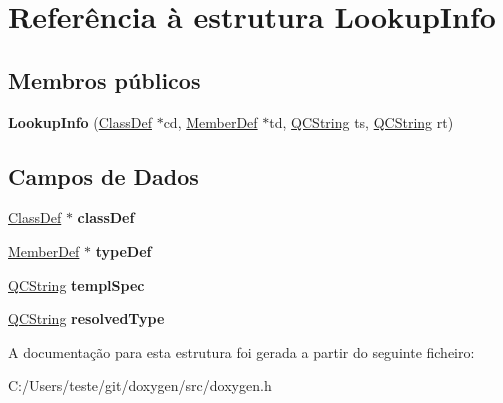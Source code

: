 \hypertarget{struct_lookup_info}{\section{Referência à estrutura Lookup\-Info}
\label{struct_lookup_info}
}
\subsection*{Membros públicos}
\begin{DoxyCompactItemize}
\item 
\hypertarget{struct_lookup_info_a99219df5d3ee05bde9ed501a3df36625}{{\bfseries Lookup\-Info} (\hyperlink{class_class_def}{Class\-Def} $\ast$cd, \hyperlink{class_member_def}{Member\-Def} $\ast$td, \hyperlink{class_q_c_string}{Q\-C\-String} ts, \hyperlink{class_q_c_string}{Q\-C\-String} rt)}\label{struct_lookup_info_a99219df5d3ee05bde9ed501a3df36625}

\end{DoxyCompactItemize}
\subsection*{Campos de Dados}
\begin{DoxyCompactItemize}
\item 
\hypertarget{struct_lookup_info_a9ecae2706174bc69faacb7156966b12e}{\hyperlink{class_class_def}{Class\-Def} $\ast$ {\bfseries class\-Def}}\label{struct_lookup_info_a9ecae2706174bc69faacb7156966b12e}

\item 
\hypertarget{struct_lookup_info_af0a145c155563dda69863421befbdac3}{\hyperlink{class_member_def}{Member\-Def} $\ast$ {\bfseries type\-Def}}\label{struct_lookup_info_af0a145c155563dda69863421befbdac3}

\item 
\hypertarget{struct_lookup_info_a9f49692ba930267b7dfbdbc9a231cae9}{\hyperlink{class_q_c_string}{Q\-C\-String} {\bfseries templ\-Spec}}\label{struct_lookup_info_a9f49692ba930267b7dfbdbc9a231cae9}

\item 
\hypertarget{struct_lookup_info_a5a854e81e0e348b24d0b42d5cb121d3d}{\hyperlink{class_q_c_string}{Q\-C\-String} {\bfseries resolved\-Type}}\label{struct_lookup_info_a5a854e81e0e348b24d0b42d5cb121d3d}

\end{DoxyCompactItemize}


A documentação para esta estrutura foi gerada a partir do seguinte ficheiro\-:\begin{DoxyCompactItemize}
\item 
C\-:/\-Users/teste/git/doxygen/src/doxygen.\-h\end{DoxyCompactItemize}
